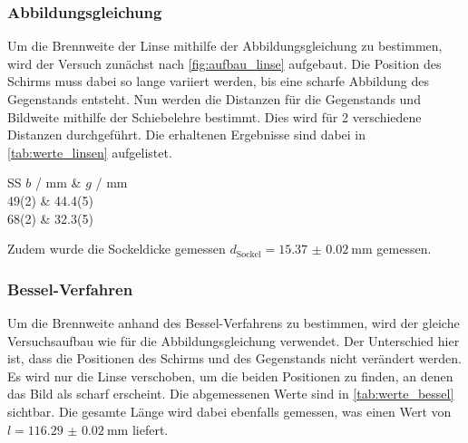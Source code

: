 \documentclass[12pt,english,ngerman]{scrartcl}
\begin{document}
\subsubsection{Abbildungsgleichung}

Um die Brennweite der Linse mithilfe der Abbildungsgleichung zu bestimmen, wird
der Versuch zunächst nach \autoref{fig:aufbau_linse} aufgebaut. Die Position
des Schirms muss dabei so lange variiert werden, bis eine scharfe Abbildung des
Gegenstands entsteht. Nun werden die Distanzen für die Gegenstands und
Bildweite mithilfe der Schiebelehre bestimmt. Dies wird für 2 verschiedene
Distanzen durchgeführt. Die erhaltenen Ergebnisse sind dabei in
\autoref{tab:werte_linsen} aufgelistet.

\begin{table}[H]
	\caption[Gemessene Bild und Gegenstandsweiten zur Bestimmung mithilfe der
		Abbildungsgleichung] {Gemessene Bild und Gegenstandsweiten zur Bestimmung
		mithilfe der Abbildungsgleichung          \\
		$b$ \dots gemessene Bildweite in \si{\mm} \\
		$g$ \dots gemessene Bildweite in \si{\mm}
	}
	\label{tab:werte_linsen}
	\centering
	\begin{tblr}{SS}
		{{{$b$ / \si{\mm}}}} & {{{$g$ / \si{\mm}}}} \\
		49(2)                & 44.4(5)              \\
		68(2)                & 32.3(5)              \\
	\end{tblr}
\end{table}

Zudem wurde die Sockeldicke gemessen
$d_\text{Sockel}=\SI{15.37(2)}{\milli\meter}$ gemessen.

\subsubsection{Bessel-Verfahren}

Um die Brennweite anhand des Bessel-Verfahrens zu bestimmen, wird der gleiche
Versuchsaufbau wie für die Abbildungsgleichung verwendet. Der Unterschied hier
ist, dass die Positionen des Schirms und des Gegenstands nicht verändert
werden. Es wird nur die Linse verschoben, um die beiden Positionen zu finden,
an denen das Bild als scharf erscheint. Die abgemessenen Werte sind in
\autoref{tab:werte_bessel} sichtbar. Die gesamte Länge wird dabei ebenfalls
gemessen, was einen Wert von $l=\SI{116.29(2)}{\mm}$ liefert.
\end{document}
